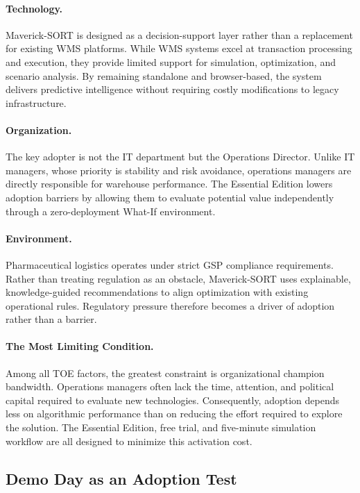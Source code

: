 \paragraph{Technology.}
Maverick-SORT is designed as a decision-support layer rather than a replacement for existing WMS platforms. While WMS systems excel at transaction processing and execution, they provide limited support for simulation, optimization, and scenario analysis. By remaining standalone and browser-based, the system delivers predictive intelligence without requiring costly modifications to legacy infrastructure.

\paragraph{Organization.}
The key adopter is not the IT department but the Operations Director. Unlike IT managers, whose priority is stability and risk avoidance, operations managers are directly responsible for warehouse performance. The Essential Edition lowers adoption barriers by allowing them to evaluate potential value independently through a zero-deployment What-If environment.

\paragraph{Environment.}
Pharmaceutical logistics operates under strict GSP compliance requirements. Rather than treating regulation as an obstacle, Maverick-SORT uses explainable, knowledge-guided recommendations to align optimization with existing operational rules. Regulatory pressure therefore becomes a driver of adoption rather than a barrier.

\paragraph{The Most Limiting Condition.}
Among all TOE factors, the greatest constraint is organizational champion bandwidth. Operations managers often lack the time, attention, and political capital required to evaluate new technologies. Consequently, adoption depends less on algorithmic performance than on reducing the effort required to explore the solution. The Essential Edition, free trial, and five-minute simulation workflow are all designed to minimize this activation cost.

\subsection{Demo Day as an Adoption Test}

